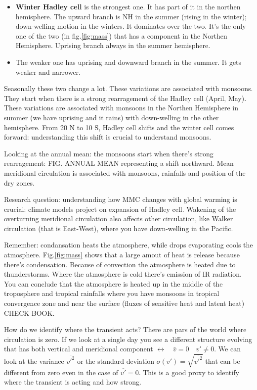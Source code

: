 \begin{itemize}
    \item \textbf{Winter Hadley cell} is the strongest one. It has part of it in the northen hemisphere. The upward branch is NH in the summer (rising in the winter); down-welling motion in the winters. It dominates over the two. It's the only one of the two (in fig.\ref{fig:mass}) that has a component in the Northen Hemisphere. Uprising branch always in the summer hemisphere.
    \item The weaker one has uprising and downward branch in the summer. It gets weaker and narrower.
\end{itemize}
Seasonally these two change a lot. These variations are associated with monsoons. They start when there is a strong rearragement of the Hadley cell (April, May). 
These variations are associated with monsoons in the Northen Hemisphere in summer (we have uprising and it rains) with down-welling in the other hemisphere. From 20 N to 10 S, Hadley cell shifts and the winter cell comes forward: understanding this shift is crucial to understand monsoons. 

Looking at the annual mean: the monsoons start when there's strong rearragement: FIG. ANNUAL MEAN
representing a shift northward. Mean meridional circulation is associated with monsoons, rainfalls and position of the dry zones. 


Research question: understanding how MMC changes with global warming is crucial: climate models project on expansion of Hadley cell. Wakening of the overturning meridional circulation also affects other circulation, like Walker circulation (that is East-West), where you have down-welling in the Pacific. 


Remember: condansation heats the atmosphere, while drops evaporating cools the atmosphere. Fig.\ref{fig:mass} shows that a large amout of heat is release because there's condensation. Because of convection the atmosphere is heated due to thunderstorms. Where the atmosphere is cold there's emission of IR radiation. You can conclude that the atmosphere is heated up in the middle of the troposphere and tropical rainfalls where you have monsoons in tropical convergence zone and near the surface (fluxes of sensitive heat and latent heat) CHECK BOOK.


How do we identify where the transient acts? There are pars of the world where circulation is zero. If we look at a single day you see a different structure evolving that has both vertical and meridional component $\leftrightarrow \quad \bar{v}=0 \quad v'\neq 0$. We can look at the variance $\overline{v'^2}$ or the standard deviation $\sigma (v')=\sqrt{\overline{v'^2}}$ that can be different from zero even in the case of $\overline{v'}=0$. This is a good proxy to identify where the transient is acting and how strong. 

